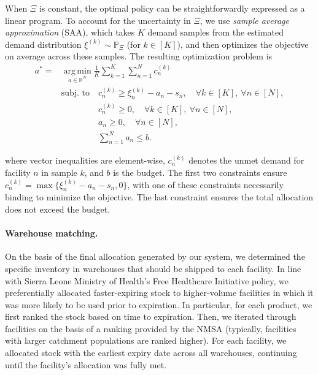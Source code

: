 \documentclass[12pt]{article}
\begin{document}
When $\Xi$ is constant, the optimal policy can be straightforwardly expressed as a linear program. To account for the uncertainty in $\Xi$, we use \emph{sample average approximation} (SAA), which takes $K$ demand samples from the estimated demand distribution $\xi^{(k)}\sim\mathbb{P}_{\Xi}$ (for $k\in[K]$), and then optimizes the objective on average across these samples. The resulting optimization problem is
\begin{align}
\label{eqn:lp}
a^* = &\operatorname*{arg\,min}_{a\in\mathbb{R}^N}\frac{1}{K}\sum_{k=1}^K\sum_{n=1}^N c_n^{(k)} \\
&\text{subj. to}\quad
  c_n^{(k)}\ge \xi_n^{(k)}-a_n-s_n,
  \quad \forall k\in[K],\ \forall n\in[N], \nonumber\\
&\phantom{\text{subj. to}\quad}
  c_n^{(k)}\ge 0,
  \quad \forall k\in[K],\ \forall n\in[N], \nonumber\\
&\phantom{\text{subj. to}\quad}
  a_n\ge 0,
  \quad \forall n\in[N], \nonumber\\
&\phantom{\text{subj. to}\quad}
  \sum_{n=1}^N a_n\le b. \nonumber
\end{align}

where vector inequalities are element-wise, $c_n^{(k)}$ denotes the unmet demand for facility $n$ in sample $k$, and $b$ is the budget. The first two constraints ensure  $c_n^{(k)}=\max\{\xi_n^{(k)}-a_n-s_n,0\}$, with one of these constraints necessarily binding to minimize the objective. The last constraint ensures the total allocation does not exceed the budget.

\paragraph{Warehouse matching.}
\label{sup:warehouse} On the basis of the final allocation generated by our system, we determined the specific inventory in warehouses that should be shipped to each facility. In line with Sierra Leone Ministry of Health's Free Healthcare Initiative policy, we preferentially allocated faster-expiring stock to higher-volume facilities in which it was more likely to be used prior to expiration. In particular, for each product, we first ranked the stock based on time to expiration. Then, we iterated through facilities on the basis of a ranking provided by the NMSA (typically, facilities with larger catchment populations are ranked higher). For each facility, we allocated stock with the earliest expiry date across all warehouses, continuing until the facility's allocation was fully met.
\end{document}
